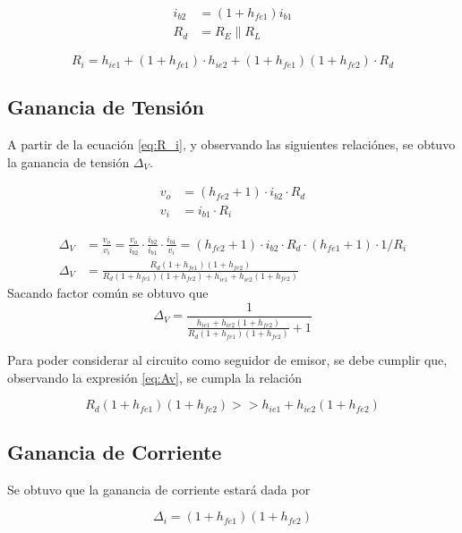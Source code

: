 \begin{align*}
    i_{b2} &= (1+h_{fe1}) i_{b1} \\
    R_d &= R_E \parallel R_L
\end{align*}

\begin{equation}
    R_i = h_{ie1} + (1 + h_{fe1})\cdot h_{ie2} + (1 + h_{fe1})(1+h_{fe2})\cdot R_d
    \label{eq:R_i}
\end{equation}

\subsection{Ganancia de Tensión}
A partir de la ecuación \eqref{eq:R_i}, y observando las siguientes relaciónes, se obtuvo la ganancia de tensión $\Delta_V$.

\begin{align}
    v_o &= (h_{fe2}+1)\cdot i_{b2}\cdot R_d \\
    v_i &= i_{b1} \cdot R_i
\end{align}

\begin{align}
    \Delta_V &= \frac{v_o}{v_i} = \frac{v_o}{i_{b2}}\cdot \frac{i_{b2}}{i_{b1}}\cdot \frac{i_{b1}}{v_i} = (h_{fe2}+1)\cdot i_{b2}\cdot R_d \cdot (h_{fe1}+1)\cdot 1/ R_i \\
    \Delta_V &= \frac{R_d(1+h_{fe1})(1+h_{fe2})}{R_d(1+h_{fe1})(1+h_{fe2}) + h_{ie1} + h_{ie2}(1+h_{fe2})}
\end{align}
Sacando factor común se obtuvo que
\begin{equation}
    \Delta_V = \frac{1}{\frac{h_{ie1} + h_{ie2}(1+h_{fe2})}{R_d(1+h_{fe1})(1+h_{fe2})} + 1 }
    \label{eq:Av}
\end{equation}

Para poder considerar al circuito como seguidor de emisor, se debe cumplir que, observando la expresión \eqref{eq:Av}, se cumpla la relación

\begin{equation}
    R_d(1+h_{fe1})(1+h_{fe2}) >> h_{ie1} + h_{ie2}(1+h_{fe2})
\end{equation}

\subsection{Ganancia de Corriente}

Se obtuvo que la ganancia de corriente estará dada por

\begin{equation}
    \Delta_i = (1+h_{fe1})(1+h_{fe2})
\end{equation}

